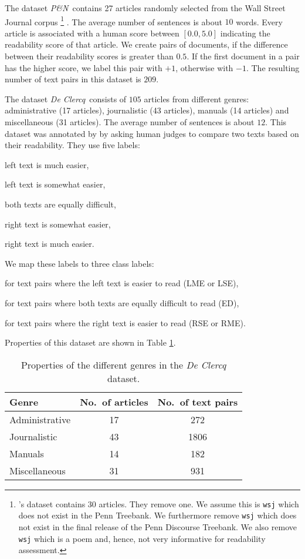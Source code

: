 The dataset \emph{P\&N}\ contains 27 articles randomly selected from
the Wall Street Journal corpus%
%
\footnote{'s dataset contains 30 articles. They
  remove one. We assume this is \texttt{wsj} which
does not exist in the Penn Treebank. We furthermore remove
\texttt{wsj} which does not exist in the final release of the
Penn Discourse Treebank. We also remove \texttt{wsj} which is a
poem and, hence, not very informative for readability assessment.}%
%
. The average number of sentences is about $10$ words. Every article is
associated with a human score between $[0.0,5.0]$ indicating the
readability score of that article. We create pairs of documents, if
the difference between their readability scores is greater than
$0.5$. If the first document in a pair has the higher score, we label
this pair with $+1$, otherwise with $-1$. The resulting number of text pairs in
this dataset is $209$.

The dataset \emph{De Clercq}\ consists of $105$ articles from different
genres: administrative (17 articles), journalistic (43 articles), manuals (14 articles) and miscellaneous (31 articles). The
average number of sentences is about $12$. This dataset was annotated
by  by asking human judges to compare two texts
based on their readability. They use five labels:
\squishlist
\item[\textbf{LME:}] left text is much easier,
\item[\textbf{LSE:}] left text is somewhat easier, 
\item[\textbf{ED:}] both texts are equally difficult,
\item[\textbf{RSE:}] right text is somewhat easier,
\item[\textbf{RME:}] right text is much easier.
\squishend

We map these labels to three class labels:

\squishlist
\item[\textbf{$+1$:}] for text pairs where the left text is easier to read
  (LME or LSE),
\item[\textbf{$0$:}] for text pairs where both texts are equally
  difficult to read (ED), 
\item[\textbf{$-1$:}] for text pairs where the right text is easier to read (RSE or RME).
\squishend

Properties of this dataset are shown in Table \ref{table:genre_prop}.

\begin{table}[!h]
\begin{tabular}{@{}lcc@{}}
\hline
Genre & No.\ of articles & No.\ of text pairs \\\hline
Administrative & 17 & 272 \\
Journalistic & 43 & 1806 \\
Manuals & 14 & 182 \\
Miscellaneous & 31 & 931\\\hline
\end{tabular}
\caption{Properties of the different genres in the \emph{De Clercq} dataset.}
\label{table:genre_prop}
\end{table}

